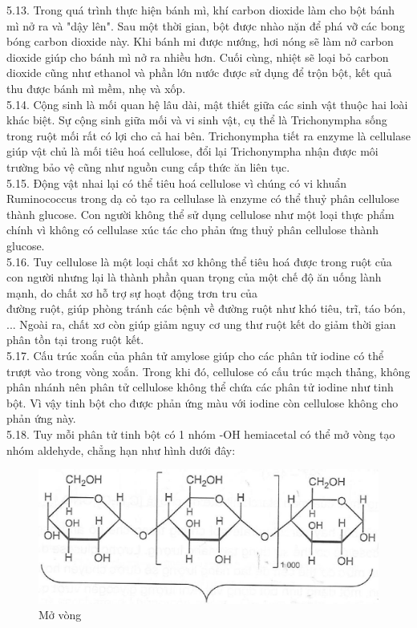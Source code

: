 \documentclass[10pt]{article}
\begin{document}
5.13. Trong quá trình thực hiện bánh mì, khí carbon dioxide làm cho bột bánh mì nở ra và "dậy lên". Sau một thời gian, bột được nhào nặn để phá vỡ các bong bóng carbon dioxide này. Khi bánh mi được nướng, hơi nóng sẽ làm nở carbon dioxide giúp cho bánh mì nở ra nhiều hơn. Cuối cùng, nhiệt sẽ loại bỏ carbon dioxide cũng như ethanol và phần lớn nước được sử dụng để trộn bột, kết quả thu được bánh mì mềm, nhẹ và xốp.\\
5.14. Cộng sinh là mối quan hệ lâu dài, mật thiết giữa các sinh vật thuộc hai loài khác biệt. Sự cộng sinh giữa mối và vi sinh vật, cụ thể là Trichonympha sống trong ruột mối rất có lợi cho cả hai bên. Trichonympha tiết ra enzyme là cellulase giúp vật chủ là mối tiêu hoá cellulose, đổi lại Trichonympha nhận được môi trường bảo vệ cũng như nguồn cung cấp thức ăn liên tục.\\
5.15. Động vật nhai lại có thể tiêu hoá cellulose vì chúng có vi khuẩn Ruminococcus trong dạ cỏ tạo ra cellulase là enzyme có thể thuỷ phân cellulose thành glucose. Con người không thể sử dụng cellulose như một loại thực phẩm chính vì không có cellulase xúc tác cho phản ứng thuỷ phân cellulose thành glucose.\\
5.16. Tuy cellulose là một loại chất xơ không thể tiêu hoá được trong ruột của con người nhưng lại là thành phần quan trọng của một chế độ ăn uống lành mạnh, do chất xơ hỗ trợ sự hoạt động trơn tru của\\
đường ruột, giúp phòng tránh các bệnh về đường ruột như khó tiêu, trĩ, táo bón, ... Ngoài ra, chất xơ còn giúp giảm nguy cơ ung thư ruột kết do giảm thời gian phân tồn tại trong ruột kết.\\
5.17. Cấu trúc xoắn của phân tử amylose giúp cho các phân tử iodine có thể trượt vào trong vòng xoắn. Trong khi đó, cellulose có cấu trúc mạch thả̉ng, không phân nhánh nên phân tử cellulose không thể chứa các phân tử iodine như tinh bột. Vì vậy tinh bột cho được phản ứng màu với iodine còn cellulose không cho phản ứng này.\\
5.18. Tuy mỗi phân tử tinh bột có 1 nhóm -OH hemiacetal có thể mở vòng tạo nhóm aldehyde, chẳng hạn như hình dưới đây:

\begin{figure}[h]
\begin{center}
  \includegraphics[width=\textwidth]{2025_10_23_b4e16b74380d0f7e7700g-036(1)}
\captionsetup{labelformat=empty}
\caption{Mở vòng}
\end{center}
\end{figure}
\end{document}
